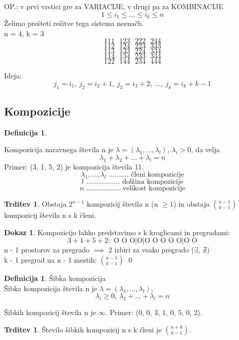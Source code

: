 \documentclass[a4paper,12pt]{article}
\theoremstyle{definition}
\newtheorem{defn}[counter]{Definicija}
\newtheorem{claim}[counter]{Trditev}
\newtheorem{pro}[counter]{Dokaz}
\theoremstyle{remark}
\begin{document}
OP.: v prvi vrstici gre za VARIACIJE, v drugi pa za KOMBINACIJE\\

\[1 \leqslant i_1 \leqslant ... \leqslant i_k \leqslant n\]
Želimo prešteti rešitve tega sistema neenačb.\\
n = 4, k = 3
\[1 1 1 \ \ \ 1 2 3 \ \ \ 2 2 2 \ \ \ 2 4 4\]
\[1 1 2 \ \ \ 1 2 4 \ \ \ 2 2 3 \ \ \ 3 3 3\]
\[1 1 3 \ \ \ 1 3 3 \ \ \ 2 2 4 \ \ \ 3 3 4\]
\[1 1 4 \ \ \ 1 3 4 \ \ \ 2 3 3 \ \ \ 3 4 4\]
\[1 2 2 \ \ \ 1 4 4 \ \ \ 2 3 4 \ \ \ 4 4 4\]

Ideja:
\[j_1 = i_1, \ j_2 = i_2 + 1, \ j_3 = i_3 + 2, \ ..., \ j_k = i_k + k - 1 \]

\subsection{Kompozicije}
\begin{defn}

\end{defn}
Kompozicija naravnega števila n je $\lambda = (\lambda_1, ..., \lambda_l)$, $\lambda_i > 0$, da velja
\[\lambda_1 + \lambda_2 + ... + \lambda_l = n\]
Primer: (3, 1, 5, 2) je kompozicija števila 11.
\[\lambda_1, ..., \lambda_l \text{ .......... členi kompozicije}\]
\[l \text{ ................. dolžina kompozicije}\]
\[n \text{ ................. velikost kompozicije}\]

\begin{claim}
Obstaja $2^{n-1}$ kompozicij števila n (n $\geqslant 1$) in obstaja $\binom{n - 1}{k - 1}$ kompozicij števila n s k členi.
\end{claim}

\begin{pro}
Kompozicijo lahko predstavimo s k kroglicami in pregradami:
\[3 + 1 + 5 + 2:\text{   O O O|O|O O O O O|O O}\]
n - 1 prostorov za pregrado $\implies$ 2 izbiri za vsako pregrado ($\exists, \ \nexists$)\\
k - 1 pregrad na n - 1 mestih: $\binom{n - 1}{k - 1}$
\qed
\end{pro}

\begin{defn}
Šibka kompozicija\\
Šibka kompozicija števila n je $\lambda = (\lambda_1, ..., \lambda_l)$,
\[\lambda_i \geqslant 0, \ \lambda_1 + ... + \lambda_l = n\]
\end{defn}
Šibkih kompozicij števila n je $\infty$.
Primer: (0, 0, 3, 1, 0, 5, 0, 2).
\begin{claim}
Število šibkih kompozicij n s k členi je $\binom{n + k}{k - 1}$.
\end{claim}
\end{document}
